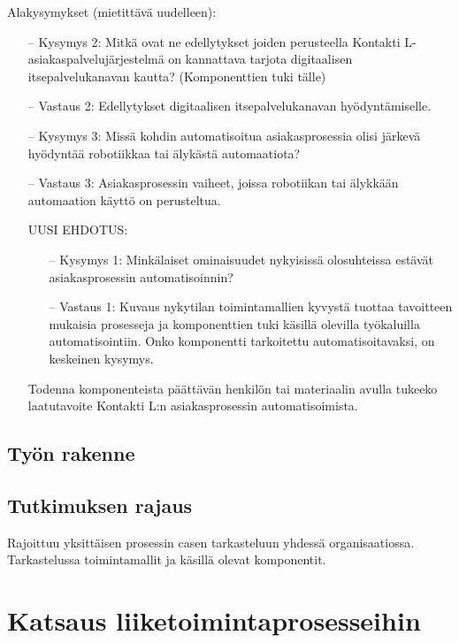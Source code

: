 \documentclass[finnish,12pt,a4paper,pdftex]{article}
\begin{document}
Alakysymykset (mietittävä uudelleen):
\begin{itemize}
\item[--]Kysymys 2: Mitkä ovat ne edellytykset joiden perusteella Kontakti L- asiakaspalvelujärjestelmä on kannattava tarjota digitaalisen itsepalvelukanavan kautta? (Komponenttien tuki tälle)
\item[--]Vastaus 2: Edellytykset digitaalisen itsepalvelukanavan hyödyntämiselle.
\item[--]Kysymys 3: Missä kohdin automatisoitua asiakasprosessia olisi järkevä hyödyntää robotiikkaa tai älykästä automaatiota?
\item[--]Vastaus 3: Asiakasprosessin vaiheet, joissa robotiikan tai älykkään automaation käyttö on perusteltua.

UUSI EHDOTUS:
\begin{itemize}
\item[--]Kysymys 1: Minkälaiset ominaisuudet nykyisissä olosuhteissa estävät asiakasprosessin automatisoinnin?
\item[--]Vastaus 1: Kuvaus nykytilan toimintamallien kyvystä tuottaa tavoitteen mukaisia prosesseja ja komponenttien tuki käsillä olevilla työkaluilla automatisointiin. Onko komponentti tarkoitettu automatisoitavaksi, on keskeinen kysymys.
\end{itemize}



Todenna komponenteista päättävän henkilön tai materiaalin avulla tukeeko laatutavoite Kontakti L:n asiakasprosessin automatisoimista. 




\end{itemize}
\subsection{Työn rakenne}


\subsection{Tutkimuksen rajaus}

Rajoittuu yksittäisen prosessin casen tarkasteluun yhdessä organisaatiossa. Tarkastelussa toimintamallit ja käsillä olevat komponentit.

\clearpage

\section{Katsaus liiketoimintaprosesseihin}
\end{document}
